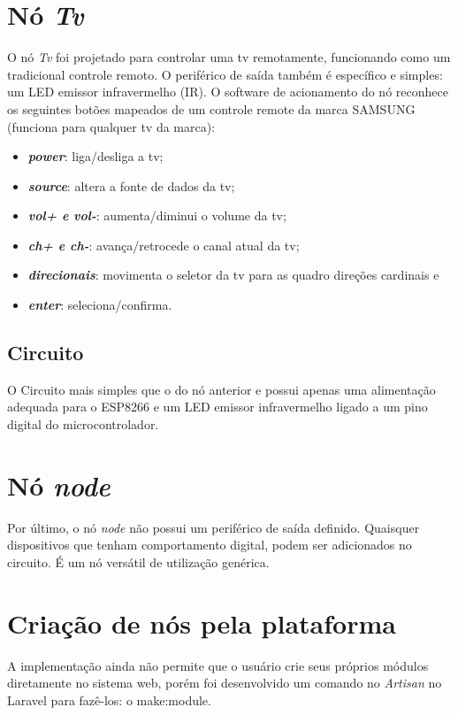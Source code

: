 \documentclass[
12pt,				%
openany,			%
twoside,			%
a4paper,			%
english,			%
french,				%
spanish,			%
brazil,				%
]{abntex2}
\begin{document}
\section{Nó \textit{Tv}}

O nó \textit{Tv} foi projetado para controlar uma tv remotamente, funcionando como um tradicional controle remoto. O periférico de saída também é específico e simples: um LED emissor infravermelho (IR). O software de acionamento do nó reconhece os seguintes botões mapeados de um controle remote da marca SAMSUNG (funciona para qualquer tv da marca):
\begin{itemize}
    \item \textit{\textbf{power}}: liga/desliga a tv;
    \item \textit{\textbf{source}}: altera a fonte de dados da tv;
    \item \textit{\textbf{vol+ e vol-}}: aumenta/diminui o volume da tv; 
    \item \textit{\textbf{ch+ e ch-}}: avança/retrocede o canal atual da tv;
    \item \textit{\textbf{direcionais}}: movimenta o seletor da tv para as quadro direções cardinais e
    \item \textit{\textbf{enter}}: seleciona/confirma.
\end{itemize}

\subsection{Circuito}
O Circuito mais simples que o do nó anterior e possui apenas uma alimentação adequada para o ESP8266 e um LED emissor infravermelho ligado a um pino digital do microcontrolador.

\section{Nó \textit{node}}
Por último, o nó \textit{node} não possui um periférico de saída definido. Quaisquer dispositivos que tenham comportamento digital, podem ser adicionados no circuito. É um nó versátil de utilização genérica.

\section{Criação de nós pela plataforma}
A implementação ainda não permite que o usuário crie seus próprios módulos diretamente no sistema web, porém foi desenvolvido um comando no \textit{Artisan} no Laravel para fazê-los: o \textsf{make:module}.
\end{document}
